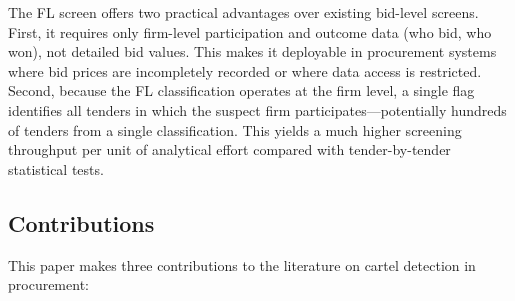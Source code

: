 The FL screen offers two practical advantages over existing bid-level screens. First, it requires only firm-level participation and outcome data (who bid, who won), not detailed bid values. This makes it deployable in procurement systems where bid prices are incompletely recorded or where data access is restricted. Second, because the FL classification operates at the firm level, a single flag identifies all tenders in which the suspect firm participates---potentially hundreds of tenders from a single classification. This yields a much higher screening throughput per unit of analytical effort compared with tender-by-tender statistical tests.

\subsection{Contributions}

This paper makes three contributions to the literature on cartel detection in procurement:


